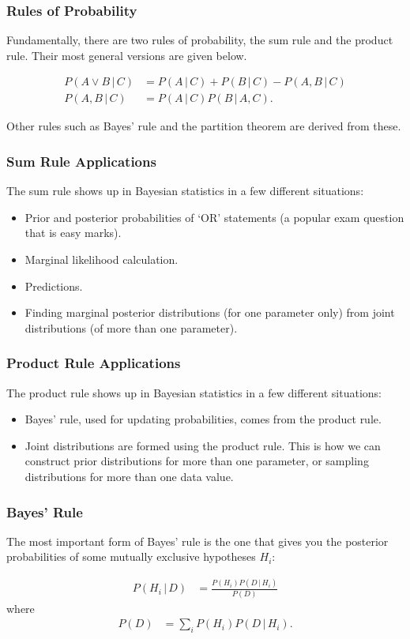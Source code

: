 \documentclass{beamer}
\newcommand{\given}{\,|\,}
\begin{document}
\begin{frame}
\frametitle{Rules of Probability}
Fundamentally, there are two rules of probability, the sum rule and the
product rule. Their most general versions are given below.

\begin{align}
P(A \vee B \given C) &= P(A \given C) + P(B \given C) - P(A, B \given C) \\
P(A, B \given C) &= P(A \given C)P(B \given A, C).
\end{align}\pause

Other rules such as Bayes' rule and the partition theorem are derived from
these.


\end{frame}


\begin{frame}
\frametitle{Sum Rule Applications}
The sum rule shows up in Bayesian statistics in a few different situations:\pause

\begin{itemize}
\item Prior and posterior probabilities of `OR' statements (a popular exam
question that is easy marks).\pause
\item Marginal likelihood calculation.\pause
\item Predictions.\pause
\item Finding marginal posterior distributions (for one parameter only)
from joint distributions (of more than one parameter).
\end{itemize}


\end{frame}


\begin{frame}
\frametitle{Product Rule Applications}
The product rule shows up in Bayesian statistics in a few different situations:\pause

\begin{itemize}
\item Bayes' rule, used for updating probabilities, comes from the product
rule.\pause
\item Joint distributions are formed using the product rule. This is how
we can construct prior distributions for more than one parameter, or
sampling distributions for more than one data value.
\end{itemize}


\end{frame}


\begin{frame}
\frametitle{Bayes' Rule}
The most important form of Bayes' rule is the one that gives you the
posterior probabilities of some mutually exclusive hypotheses $H_i$:

\begin{align}
P(H_i \given D) &= \frac{P(H_i)P(D \given H_i)}{P(D)}
\end{align} \pause
where
\begin{align}
P(D) &= \sum_i P(H_i) P(D \given H_i).
\end{align}


\end{frame}
\end{document}
